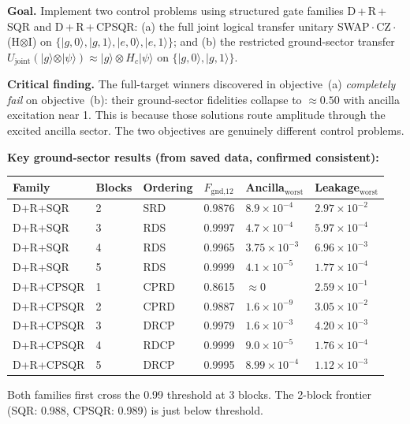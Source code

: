 \documentclass[11pt,letterpaper]{article}
\begin{document}
\textbf{Goal.}  Implement two control problems using structured gate families
D\,+\,R\,+\,SQR and D\,+\,R\,+\,CPSQR:
(a) the full joint logical transfer unitary SWAP\,$\cdot$\,CZ\,$\cdot$\,(H$\otimes$I)
on $\{\vert g,0\rangle, \vert g,1\rangle, \vert e,0\rangle, \vert e,1\rangle\}$; and
(b) the restricted ground-sector transfer
$U_\text{joint}(\vert g\rangle \otimes \vert\psi\rangle) \approx \vert g\rangle \otimes H_c\vert\psi\rangle$
on $\{\vert g,0\rangle, \vert g,1\rangle\}$.

\textbf{Critical finding.}  The full-target winners discovered in objective~(a)
\emph{completely fail} on objective~(b): their ground-sector fidelities collapse to
$\approx 0.50$ with ancilla excitation near 1.  This is because those solutions
route amplitude through the excited ancilla sector.  The two objectives are
genuinely different control problems.

\textbf{Key ground-sector results (from saved data, confirmed consistent):}

\begin{center}
\begin{tabular}{llllll}
\toprule
Family & Blocks & Ordering & $F_\text{gnd,12}$ & Ancilla$_\text{worst}$ & Leakage$_\text{worst}$ \\
\midrule
D+R+SQR & 2 & SRD & 0.9876 & $8.9\times10^{-4}$ & $2.97\times10^{-2}$ \\
D+R+SQR & 3 & RDS & 0.9997 & $4.7\times10^{-4}$ & $5.97\times10^{-4}$ \\
D+R+SQR & 4 & RDS & 0.9965 & $3.75\times10^{-3}$ & $6.96\times10^{-3}$ \\
D+R+SQR & 5 & RDS & 0.9999 & $4.1\times10^{-5}$ & $1.77\times10^{-4}$ \\
\midrule
D+R+CPSQR & 1 & CPRD & 0.8615 & $\approx 0$ & $2.59\times10^{-1}$ \\
D+R+CPSQR & 2 & CPRD & 0.9887 & $1.6\times10^{-9}$ & $3.05\times10^{-2}$ \\
D+R+CPSQR & 3 & DRCP & 0.9979 & $1.6\times10^{-3}$ & $4.20\times10^{-3}$ \\
D+R+CPSQR & 4 & RDCP & 0.9999 & $9.0\times10^{-5}$ & $1.76\times10^{-4}$ \\
D+R+CPSQR & 5 & DRCP & 0.9995 & $8.99\times10^{-4}$ & $1.12\times10^{-3}$ \\
\bottomrule
\end{tabular}
\end{center}

Both families first cross the 0.99 threshold at 3 blocks.
The 2-block frontier (SQR: 0.988, CPSQR: 0.989) is just below threshold.
\end{document}
